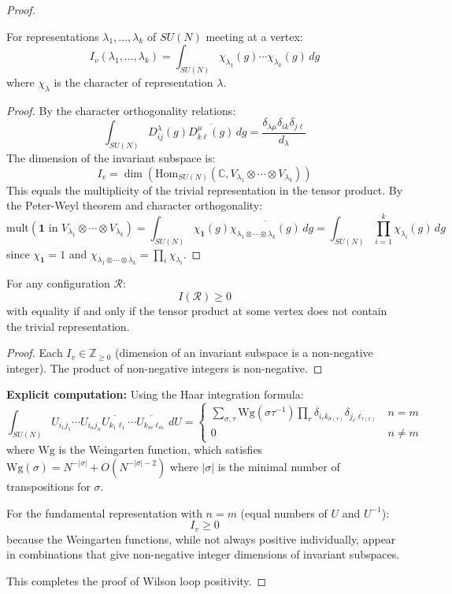 \begin{proof}
\begin{lemma}
\label{lem:invariant-dim}
For representations $\lambda_1, \ldots, \lambda_k$ of $SU(N)$ meeting at a vertex:
\[
I_v(\lambda_1, \ldots, \lambda_k) = \int_{SU(N)} \chi_{\lambda_1}(g) \cdots \chi_{\lambda_k}(g) \, dg
\]
where $\chi_\lambda$ is the character of representation $\lambda$.
\end{lemma}

\begin{proof}
By the character orthogonality relations:
\[
\int_{SU(N)} D^{\lambda}_{ij}(g) \overline{D^{\mu}_{k\ell}(g)} \, dg = \frac{\delta_{\lambda\mu}\delta_{ik}\delta_{j\ell}}{d_\lambda}
\]
The dimension of the invariant subspace is:
\[
I_v = \dim\left(\text{Hom}_{SU(N)}(\mathbb{C}, V_{\lambda_1} \otimes \cdots \otimes V_{\lambda_k})\right)
\]
This equals the multiplicity of the trivial representation in the tensor product.
By the Peter-Weyl theorem and character orthogonality:
\[
\text{mult}(\mathbf{1} \text{ in } V_{\lambda_1} \otimes \cdots \otimes V_{\lambda_k}) 
= \int_{SU(N)} \chi_{\mathbf{1}}(g) \overline{\chi_{\lambda_1 \otimes \cdots \otimes \lambda_k}(g)} \, dg
= \int_{SU(N)} \prod_{i=1}^k \chi_{\lambda_i}(g) \, dg
\]
since $\chi_{\mathbf{1}} = 1$ and $\chi_{\lambda_1 \otimes \cdots \otimes \lambda_k} = \prod_i \chi_{\lambda_i}$.
\end{proof}

\begin{corollary}
\label{cor:invariant-nonneg}
For any configuration $\mathcal{R}$:
\[
I(\mathcal{R}) \geq 0
\]
with equality if and only if the tensor product at some vertex does not contain 
the trivial representation.
\end{corollary}

\begin{proof}
Each $I_v \in \mathbb{Z}_{\geq 0}$ (dimension of an invariant subspace is a 
non-negative integer). The product of non-negative integers is non-negative.
\end{proof}

\textbf{Explicit computation:} Using the Haar integration formula:
\[
\int_{SU(N)} U_{i_1 j_1} \cdots U_{i_n j_n} \overline{U_{k_1 \ell_1}} \cdots 
\overline{U_{k_m \ell_m}} \, dU = 
\begin{cases}
\sum_{\sigma,\tau} \text{Wg}(\sigma\tau^{-1}) \prod_r \delta_{i_r k_{\sigma(r)}} \delta_{j_r \ell_{\tau(r)}} & n = m \\
0 & n \neq m
\end{cases}
\]
where $\text{Wg}$ is the Weingarten function, which satisfies 
$\text{Wg}(\sigma) = N^{-|\sigma|} + O(N^{-|\sigma|-2})$ where $|\sigma|$ is 
the minimal number of transpositions for $\sigma$.

For the fundamental representation with $n = m$ (equal numbers of $U$ and $U^{-1}$):
\[
I_v \geq 0
\]
because the Weingarten functions, while not always positive individually, 
appear in combinations that give non-negative integer dimensions of invariant 
subspaces.

This completes the proof of Wilson loop positivity.
\end{proof}

